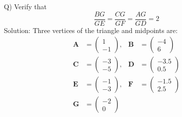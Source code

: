 \documentclass[journal,12pt,twocolumn]{IEEEtran}
\theoremstyle{remark}
\newcommand{\myvec}[1]{\begin{pmatrix}#1\end{pmatrix}}
\let\vec\mathbf
\begin{document}
Q) Verify that \\
$$\frac{BG}{GE}=\frac{CG}{GF}=\frac{AG}{GD}=2$$
Solution: Three vertices of the triangle and midpoints are:
\begin{align}
\vec{A} &= \myvec{1 \\ -1} , & \vec{B} &= \myvec{-4 \\ 6} \\
\vec{C} &= \myvec{-3 \\ -5} , & \vec{D} &= \myvec{-3.5 \\ 0.5} \\
\vec{E} &= \myvec{-1 \\ -3}  , & \vec{F} &= \myvec{-1.5 \\ 2.5} \\
\vec{G} &= \myvec{-2 \\ 0}
\end{align}
\end{document}
